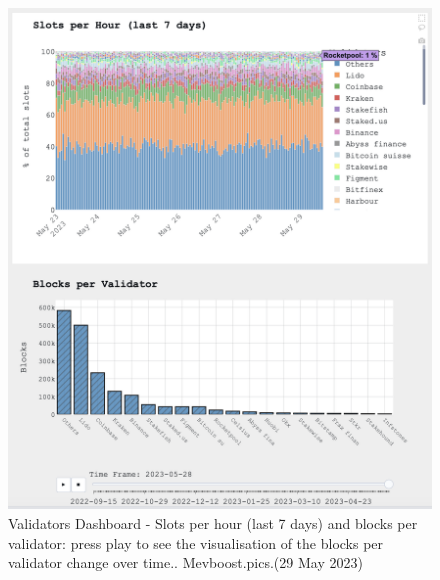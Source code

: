 \documentclass[UTF8]{article}
\begin{document}
{\begin{figure}[htbp]
\begin{center}
\includegraphics[width=0.9\linewidth]{images/mevvalidator2}
\caption{Validators Dashboard - Slots per hour (last 7 days) and blocks per validator: press play to see the visualisation of the blocks per validator change over time.. Mevboost.pics.(29 May 2023)}
\label{fig:mevvalidator2}
\end{center}
\end{figure}

}
\end{document}
